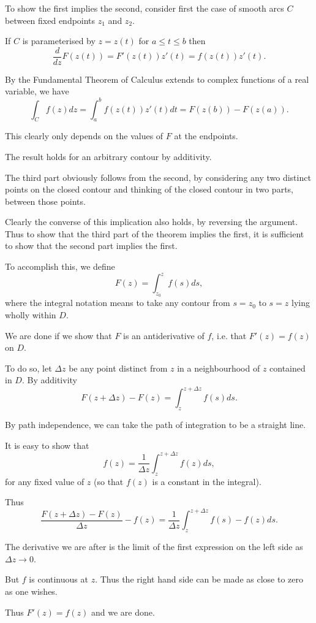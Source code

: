 \documentclass[a4paper,10pt]{article}
\begin{document}
To show the first implies the second, consider first the case of smooth arcs $C$ between fixed endpoints $z_1$ and $z_2$.

If $C$ is parameterised by $z = z(t)$ for $a \leq t \leq b$ then
$$\frac{d}{dz}F(z(t)) = F'(z(t))z'(t) = f(z(t))z'(t).$$

By the Fundamental Theorem of Calculus extends to complex functions of a real variable, we have
$$\int_C f(z)dz = \int_a^b f(z(t))z'(t)dt = F(z(b)) - F(z(a)).$$

This clearly only depends on the values of $F$ at the endpoints.

The result holds for an arbitrary contour by additivity.

The third part obviously follows from the second, by considering any two distinct points on the closed contour and thinking of the closed contour in two parts, between those points.

Clearly the converse of this implication also holds, by reversing the argument. Thus to show that the third part of the theorem implies the first, it is sufficient to show that the second part implies the first.

To accomplish this, we define
$$F(z) = \int_{z_0}^z f(s)ds,$$
where the integral notation means to take any contour from $s = z_0$ to $s = z$ lying wholly within $D$.

We are done if we show that $F$ is an antiderivative of $f$, i.e. that $F'(z) = f(z)$ on $D$.

To do so, let $\Delta z$ be any point distinct from $z$ in a neighbourhood of $z$ contained in $D$. By additivity
$$F(z + \Delta z) - F(z) = \int_z^{z + \Delta z} f(s)ds.$$

By path independence, we can take the path of integration to be a straight line.

It is easy to show that
$$f(z) = \frac{1}{\Delta z}\int_z^{z + \Delta z}f(z) ds,$$
for any fixed value of $z$ (so that $f(z)$ is a constant in the integral).

Thus
$$\frac{F(z + \Delta z) - F(z)}{\Delta z} - f(z) = \frac{1}{\Delta z}\int_z^{z + \Delta z}f(s) - f(z)ds.$$

The derivative we are after is the limit of the first expression on the left side as $\Delta z \to 0$.

But $f$ is continuous at $z$. Thus the right hand side can be made as close to zero as one wishes.

Thus $F'(z) = f(z)$ and we are done.
\end{document}
